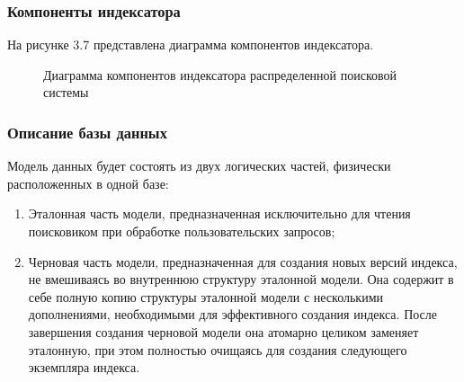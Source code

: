 \subsubsection{Компоненты индексатора}

На рисунке 3.7 представлена диаграмма компонентов индексатора.

\begin{figure}[H]
\caption{Диаграмма компонентов индексатора распределенной поисковой системы}
\label{indexer/diagram_components:image}
\end{figure}

\subsubsection{Описание базы данных}

Модель данных будет состоять из двух логических частей, физически расположенных в одной базе:
\begin{enumerate}
\item Эталонная часть модели, предназначенная исключительно для чтения поисковиком при обработке пользовательских запросов;
\item Черновая часть модели, предназначенная для создания новых версий индекса, не вмешиваясь во внутреннюю структуру эталонной модели. Она содержит в себе полную копию структуры эталонной модели с несколькими дополнениями, необходимыми для эффективного создания индекса. После завершения создания черновой модели она атомарно целиком заменяет эталонную, при этом полностью очищаясь для создания следующего экземпляра индекса.
\end{enumerate}

